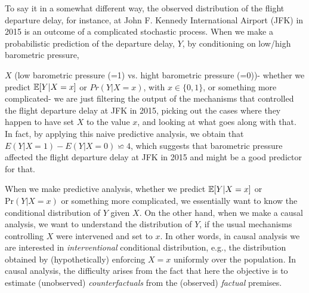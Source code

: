 \begin{example}
{To say it in a somewhat different way, the observed distribution of
the flight departure delay, for instance,  at John F. Kennedy International Airport (JFK) in 2015 is an outcome of a complicated stochastic process. When we make
a probabilistic prediction of the departure delay, $Y$,  by
conditioning on low/high barometric pressure, $X$ (low barometric pressure (=1) vs. hight barometric pressure (=0))- whether we predict $\mathbb{E}[Y | X = x]$ or
$Pr(Y | X = x)$, with $x \in \{0,1\}$, or something more
complicated- we are just filtering the output of
the mechanisms that controlled the flight departure
 delay at JFK in 2015, picking out the cases where they
  happen to have set $X$ to the value $x$, and looking
  at what goes along with that. In fact, by applying this
   naive predictive analysis, we obtain that
   $E(Y | X = 1)-E(Y | X = 0)\backsimeq 4$, which suggests that
    barometric pressure affected the flight departure delay at
    JFK in 2015 and might be a good predictor for that.}
\end{example}





When we make predictive analysis, whether we predict $\mathbb{E}[Y | X = x]$ or $\textrm{Pr}(Y | X = x)$ or
something more complicated, we essentially want to know the conditional distribution of
$Y$ given $X$. On the other hand, when we make a causal
analysis, we want to understand the distribution of $Y$, if the
usual mechanisms controlling $X$ were intervened and set to $x$.
In other words, in causal analysis we are interested in {\em  interventional} conditional
distribution, e.g.,  the distribution  obtained by (hypothetically)
enforcing $X = x$ uniformly over the population.  In causal analysis, the difficulty arises   from the fact that here the objective is to estimate (unobserved)
   {\em counterfactuals} from the (observed) {\em factual} premises.


